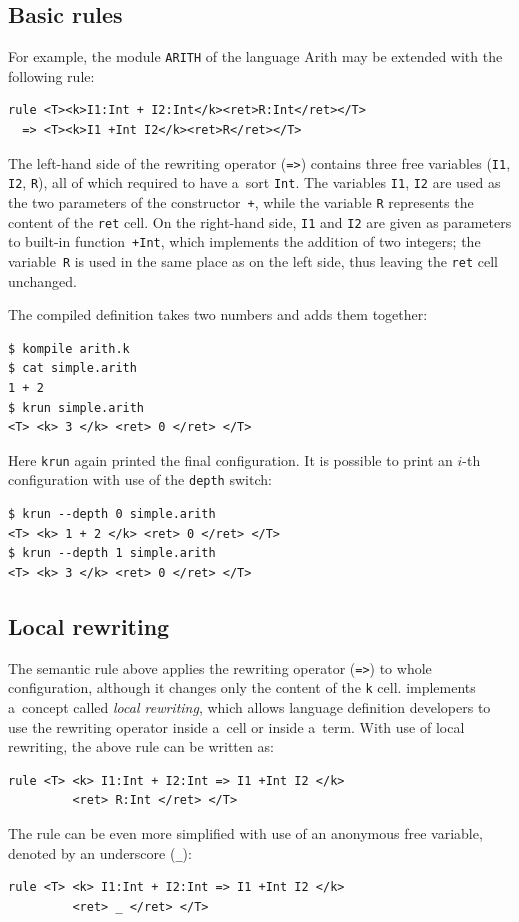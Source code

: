\documentclass[nolot,nolof,nocover,printed]{fithesis3}
\newcommand{\krun}{\texttt{krun}\xspace}
\begin{document}
\subsection{Basic rules}
For example, the module \lstinline|ARITH| of the language Arith may be extended with the following rule:
\begin{lstlisting}
rule <T><k>I1:Int + I2:Int</k><ret>R:Int</ret></T> 
  => <T><k>I1 +Int I2</k><ret>R</ret></T>
\end{lstlisting}
The left-hand side of the rewriting operator (\lstinline|=>|) contains three free variables (\lstinline|I1|, \lstinline|I2|, \lstinline|R|), all of which required to have a~sort \lstinline|Int|. The variables \lstinline|I1|, \lstinline|I2| are used as the two parameters of the constructor~\lstinline|+|, while the variable \lstinline|R| represents the content of the \lstinline|ret| cell. On the right-hand side, \lstinline|I1| and \lstinline|I2| are given as parameters to built-in function~\lstinline|+Int|, which implements the addition of two integers; the variable~\lstinline|R| is used in the same place as on the left side, thus leaving the \lstinline|ret| cell unchanged.

The compiled definition takes two numbers and adds them together:
\begin{lstlisting}
$ kompile arith.k
$ cat simple.arith
1 + 2
$ krun simple.arith
<T> <k> 3 </k> <ret> 0 </ret> </T>
\end{lstlisting}
Here \krun again printed the final configuration. It is possible to print an $i$-th configuration with use of the \lstinline|depth| switch:
\begin{lstlisting}
$ krun --depth 0 simple.arith
<T> <k> 1 + 2 </k> <ret> 0 </ret> </T>
$ krun --depth 1 simple.arith
<T> <k> 3 </k> <ret> 0 </ret> </T>
\end{lstlisting}

\subsection{Local rewriting}
The semantic rule above applies the rewriting operator (\lstinline|=>|) to whole configuration, although it changes only the content of the \lstinline|k| cell. \K implements a~concept called \textit{local rewriting}, which allows language definition developers to use the rewriting operator inside a~cell or inside a~term. With use of local rewriting, the above rule can be written as:
\begin{lstlisting}
rule <T> <k> I1:Int + I2:Int => I1 +Int I2 </k>
         <ret> R:Int </ret> </T>
\end{lstlisting}
The rule can be even more simplified with use of an anonymous free variable, denoted by an underscore (\lstinline|_|):
\begin{lstlisting}
rule <T> <k> I1:Int + I2:Int => I1 +Int I2 </k>
         <ret> _ </ret> </T>
\end{lstlisting}
\end{document}
